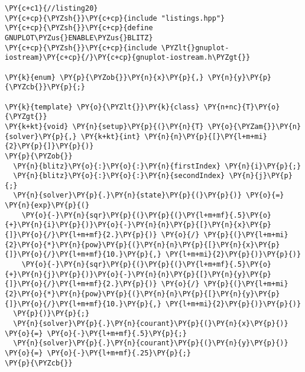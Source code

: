 \begin{Verbatim}[commandchars=\\\{\}]
\PY{c+c1}{//listing20}
\PY{c+cp}{\PYZsh{}}\PY{c+cp}{include "listings.hpp"}
\PY{c+cp}{\PYZsh{}}\PY{c+cp}{define GNUPLOT\PYZus{}ENABLE\PYZus{}BLITZ}
\PY{c+cp}{\PYZsh{}}\PY{c+cp}{include \PYZlt{}gnuplot-iostream}\PY{c+cp}{/}\PY{c+cp}{gnuplot-iostream.h\PYZgt{}}

\PY{k}{enum} \PY{p}{\PYZob{}}\PY{n}{x}\PY{p}{,} \PY{n}{y}\PY{p}{\PYZcb{}}\PY{p}{;}

\PY{k}{template} \PY{o}{\PYZlt{}}\PY{k}{class} \PY{n+nc}{T}\PY{o}{\PYZgt{}}
\PY{k+kt}{void} \PY{n}{setup}\PY{p}{(}\PY{n}{T} \PY{o}{\PYZam{}}\PY{n}{solver}\PY{p}{,} \PY{k+kt}{int} \PY{n}{n}\PY{p}{[}\PY{l+m+mi}{2}\PY{p}{]}\PY{p}{)} 
\PY{p}{\PYZob{}}
  \PY{n}{blitz}\PY{o}{:}\PY{o}{:}\PY{n}{firstIndex} \PY{n}{i}\PY{p}{;}
  \PY{n}{blitz}\PY{o}{:}\PY{o}{:}\PY{n}{secondIndex} \PY{n}{j}\PY{p}{;}
  \PY{n}{solver}\PY{p}{.}\PY{n}{state}\PY{p}{(}\PY{p}{)} \PY{o}{=} \PY{n}{exp}\PY{p}{(}
    \PY{o}{-}\PY{n}{sqr}\PY{p}{(}\PY{p}{(}\PY{l+m+mf}{.5}\PY{o}{+}\PY{n}{i}\PY{p}{)}\PY{o}{-}\PY{n}{n}\PY{p}{[}\PY{n}{x}\PY{p}{]}\PY{o}{/}\PY{l+m+mf}{2.}\PY{p}{)} \PY{o}{/} \PY{p}{(}\PY{l+m+mi}{2}\PY{o}{*}\PY{n}{pow}\PY{p}{(}\PY{n}{n}\PY{p}{[}\PY{n}{x}\PY{p}{]}\PY{o}{/}\PY{l+m+mf}{10.}\PY{p}{,} \PY{l+m+mi}{2}\PY{p}{)}\PY{p}{)}
    \PY{o}{-}\PY{n}{sqr}\PY{p}{(}\PY{p}{(}\PY{l+m+mf}{.5}\PY{o}{+}\PY{n}{j}\PY{p}{)}\PY{o}{-}\PY{n}{n}\PY{p}{[}\PY{n}{y}\PY{p}{]}\PY{o}{/}\PY{l+m+mf}{2.}\PY{p}{)} \PY{o}{/} \PY{p}{(}\PY{l+m+mi}{2}\PY{o}{*}\PY{n}{pow}\PY{p}{(}\PY{n}{n}\PY{p}{[}\PY{n}{y}\PY{p}{]}\PY{o}{/}\PY{l+m+mf}{10.}\PY{p}{,} \PY{l+m+mi}{2}\PY{p}{)}\PY{p}{)}
  \PY{p}{)}\PY{p}{;}  
  \PY{n}{solver}\PY{p}{.}\PY{n}{courant}\PY{p}{(}\PY{n}{x}\PY{p}{)} \PY{o}{=} \PY{o}{-}\PY{l+m+mf}{.5}\PY{p}{;} 
  \PY{n}{solver}\PY{p}{.}\PY{n}{courant}\PY{p}{(}\PY{n}{y}\PY{p}{)} \PY{o}{=} \PY{o}{-}\PY{l+m+mf}{.25}\PY{p}{;}
\PY{p}{\PYZcb{}}


\end{Verbatim}
